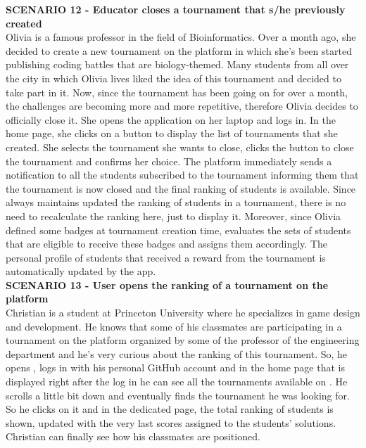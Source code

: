 	\textbf{SCENARIO 12 - Educator closes a tournament that s/he previously created}\\
    Olivia is a famous professor in the field of Bioinformatics. Over a month ago, she decided to create a new tournament on the \app platform in which she's been started publishing coding battles that are biology-themed. Many students from all over the city in which Olivia lives liked the idea of this tournament and decided to take part in it. Now, since the tournament has been going on for over a month, the challenges are becoming more and more repetitive, therefore Olivia decides to officially close it. She opens the \app application on her laptop and logs in. In the home page, she clicks on a button to display the list of tournaments that she created. She selects the tournament she wants to close, clicks the button to close the tournament and confirms her choice. The \app platform immediately sends a notification to all the students subscribed to the tournament informing them that the tournament is now closed and the final ranking of students is available. Since \app always maintains updated the ranking of students in a tournament, there is no need to recalculate the ranking here, just to display it. Moreover, since Olivia defined some badges at tournament creation time, \app evaluates the sets of students that are eligible to receive these badges and assigns them accordingly. The personal profile of students that received a reward from the tournament is automatically updated by the app.\\

    \textbf{SCENARIO 13 - User opens the ranking of a tournament on the \app platform}\\
    Christian is a student at Princeton University where he specializes in game design and development. He knows that some of his classmates are participating in a tournament on the \app platform organized by some of the professor of the engineering department and he's very curious about the ranking of this tournament. So, he opens \app, logs in with his personal GitHub account and in the home page that is displayed right after the log in he can see all the tournaments available on \app. He scrolls a little bit down and eventually finds the tournament he was looking for. So he clicks on it and in the dedicated page, the total ranking of students is shown, updated with the very last scores assigned to the students' solutions. Christian can finally see how his classmates are positioned.\\


